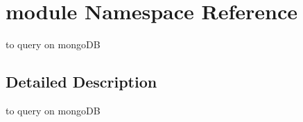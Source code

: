 \hypertarget{namespacemodule}{}\section{module Namespace Reference}
\label{namespacemodule}


to query on mongo\+DB  




\subsection{Detailed Description}
to query on mongo\+DB 